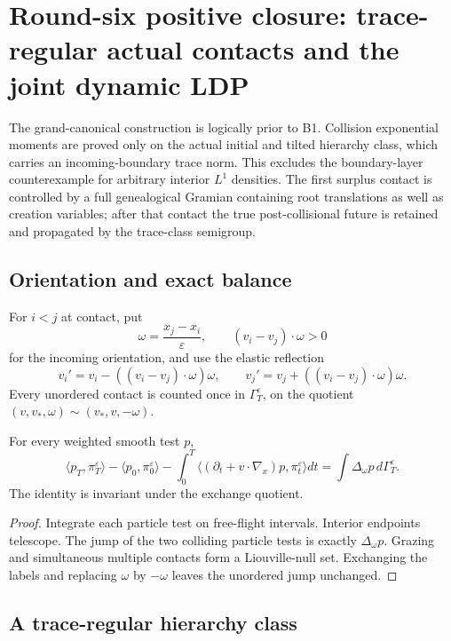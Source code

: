 \section{Round-six positive closure: trace-regular actual contacts and the joint dynamic LDP}
\label{sec:r6-b2}

The grand-canonical construction is logically prior to B1.  Collision
exponential moments are proved only on the actual initial and tilted hierarchy
class, which carries an incoming-boundary trace norm.  This excludes the
boundary-layer counterexample for arbitrary interior \(L^1\) densities.  The
first surplus contact is controlled by a full genealogical Gramian containing
root translations as well as creation variables; after that contact the true
post-collisional future is retained and propagated by the trace-class
semigroup.

\subsection{Orientation and exact balance}

For \(i<j\) at contact, put
\[
\omega=\frac{x_j-x_i}{\varepsilon},
\qquad (v_i-v_j)\cdot\omega>0
\]
for the incoming orientation, and use the elastic reflection
\[
v_i'=v_i-((v_i-v_j)\cdot\omega)\omega,
\qquad
v_j'=v_j+((v_i-v_j)\cdot\omega)\omega.
\]
Every unordered contact is counted once in \(\Gamma_T^\varepsilon\), on the
quotient \((v,v_*,\omega)\sim(v_*,v,-\omega)\).

\begin{proposition}
\label{prop:r6-b2-balance}
For every weighted smooth test \(p\),
\[
\langle p_T,\pi_T^\varepsilon\rangle-
\langle p_0,\pi_0^\varepsilon\rangle-
\int_0^T\langle(\partial_t+v\cdot\nabla_x)p,
\pi_t^\varepsilon\rangle dt
=\int\Delta_\omega p\,d\Gamma_T^\varepsilon.
\]
The identity is invariant under the exchange quotient.
\end{proposition}

\begin{proof}
Integrate each particle test on free-flight intervals.  Interior endpoints
telescope.  The jump of the two colliding particle tests is exactly
\(\Delta_\omega p\).  Grazing and simultaneous multiple contacts form a
Liouville-null set.  Exchanging the labels and replacing \(\omega\) by
\(-\omega\) leaves the unordered jump unchanged.
\end{proof}

\subsection{A trace-regular hierarchy class}

